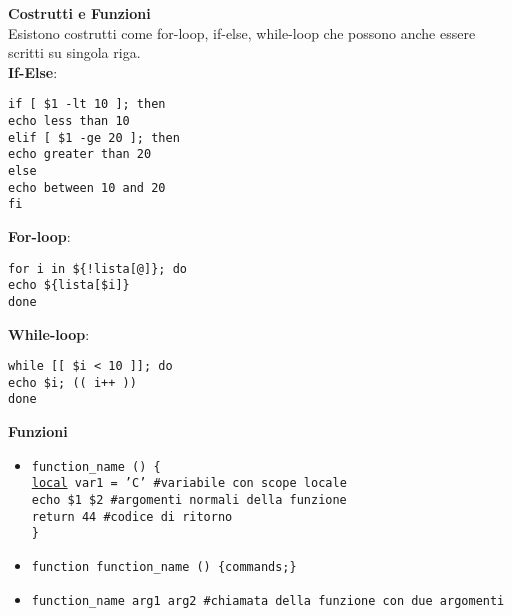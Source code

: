 \begin{flushleft}
  \textbf{Costrutti e Funzioni} \\
  Esistono costrutti come for-loop, if-else, while-loop che possono anche essere scritti 
  su singola riga. \\ 
  \textbf{If-Else}:
  \begin{flushleft}
    \texttt{if [ \$1 -lt 10 ]; then \\
            \tab echo less than 10 \\ 
            elif [ \$1 -ge 20 ]; then \\
            \tab echo greater than 20 \\
            else \\ 
            \tab echo between 10 and 20 \\
            fi}
  \end{flushleft}
  \textbf{For-loop}:
  \begin{flushleft}
    \texttt{for i in \$\{!lista[@]\}; do \\ 
            \tab echo \$\{lista[\$i]\} \\
            done}
  \end{flushleft}
  \textbf{While-loop}: 
  \begin{flushleft}
    \texttt{while [[ \$i < 10 ]]; do \\ 
          \tab echo \$i; (( i++ )) \\
          done}   
  \end{flushleft}
  \textbf{Funzioni} \par 
  \begin{itemize}
    \item \texttt{function\_name () \{ \\
              \tab \underline{local} var1 = 'C' \#variabile con scope locale \\ 
              \tab echo \$1 \$2 \#argomenti normali della funzione \\
              \tab return 44 \#codice di ritorno \\
              \}
          }\\
    \item \texttt{function function\_name () \{commands;\}} \\
    \item \texttt{function\_name arg1 arg2  \#chiamata della funzione con due argomenti }
  \end{itemize}
\end{flushleft}
